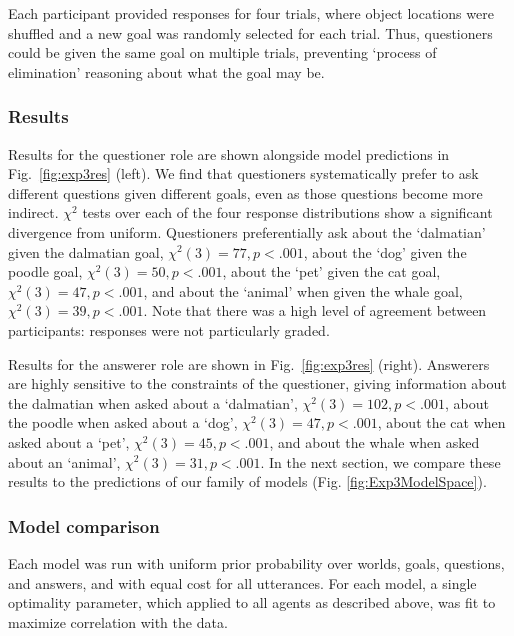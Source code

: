 \documentclass[12pt, floatsintext, jou]{apa6}
\begin{document}
Each participant provided responses for four trials, where object locations were shuffled and a new goal was randomly selected for each trial. Thus, questioners could be given the same goal on multiple trials, preventing `process of elimination' reasoning about what the goal may be.

\subsubsection{Results}
Results for the questioner role are shown alongside model predictions in Fig.~\ref{fig:exp3res} (left). We find that questioners systematically prefer to ask different questions given different goals, even as those questions become more indirect. $\chi^2$ tests over each of the four response distributions show a significant divergence from uniform. Questioners preferentially ask about the `dalmatian' given the  dalmatian goal, ${\chi^2(3) = 77}, {p < .001}$, about the `dog' given the poodle goal, ${\chi^2(3) = 50}, {p <.001}$, about the `pet' given the cat goal, ${\chi^2(3) = 47},  {p <.001}$, and about the `animal' when given the whale goal, ${\chi^2(3) = 39}, {p <.001}$. Note that there was a high level of agreement between participants: responses were not particularly graded.

Results for the answerer role are shown in Fig.~\ref{fig:exp3res} (right). Answerers are highly sensitive to the constraints of the questioner, giving information about the dalmatian when asked about a `dalmatian', ${\chi^2(3) = 102}, {p <.001}$, about the poodle when asked about a `dog', ${\chi^2(3) = 47}, {p <.001}$, about the cat when asked about a `pet', ${\chi^2(3) = 45}, {p<.001}$, and about the whale when asked about an `animal', ${\chi^2(3) = 31}, {p < .001}$. In the next section, we compare these results to the predictions of our family of models (Fig. \ref{fig:Exp3ModelSpace}). 

\subsubsection{Model comparison}

Each model was run with uniform prior probability over worlds, goals, questions, and answers, and with equal cost for all utterances. For each model, a single optimality parameter, which applied to all agents as described above, was fit to maximize correlation with the data. 
\end{document}
